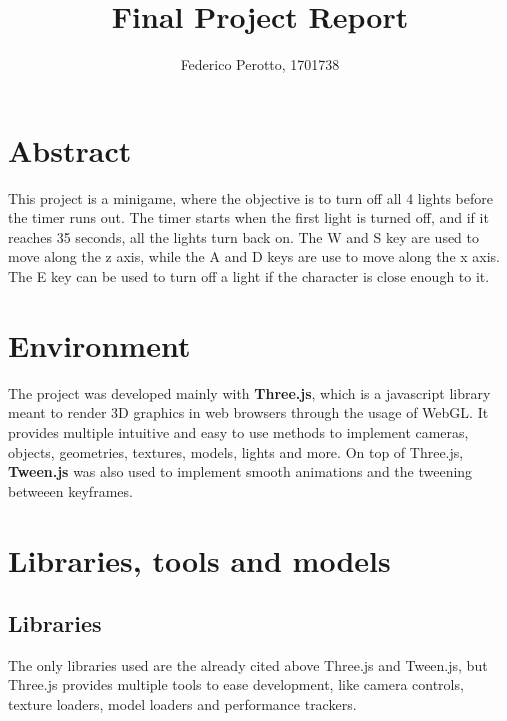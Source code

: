 \documentclass[14pt]{article}
\title{Final Project Report}
\author{Federico Perotto, 1701738}
\date{} %
\begin{document}
\maketitle

\tableofcontents
\newpage

\section{Abstract}
This project is a minigame, where the objective is to turn off all 4 lights before the timer runs out. The timer starts when the first light is turned off, and if it reaches 35 seconds, all the lights turn back on.
The W and S key are used to move along the z axis, while the A and D keys are use to move along the x axis. The E key can be used to turn off a light if the character is close enough to it.

\section{Environment}
The project was developed mainly with \textbf{Three.js}, which is a javascript library meant to render 3D graphics in web browsers through the usage of WebGL. It provides multiple intuitive and easy to use methods to implement cameras, objects, geometries, textures, models, lights and more. On top of Three.js, \textbf{Tween.js} was also used to implement smooth animations and the tweening betweeen keyframes.

\section{Libraries, tools and models}
\subsection{Libraries}
The only libraries used are the already cited above Three.js and Tween.js, but Three.js provides multiple tools to ease development, like camera controls, texture loaders, model loaders and performance trackers.
\end{document}
